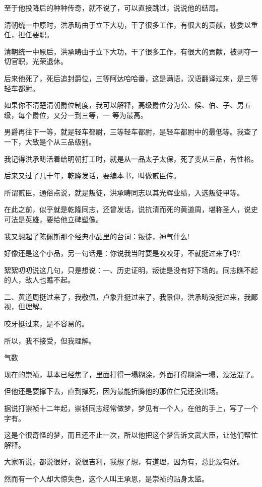 \documentclass[11pt,a4paper,onecolumn]{article}
\begin{document}
至于他投降后的种种传奇，就不说了，可以直接跳过，说说他的结局。

清朝统一中原时，洪承畴由于立下大功，干了很多工作，有很大的贡献，被委以重任，担任要职。

清朝统一中原后，洪承畴由于立下大功，干了很多工作，有很大的贡献，被剥夺一切官职，光荣退休。

后来他死了，死后追封爵位，三等阿达哈哈番，这是满语，汉语翻译过来，是三等轻车都尉。

如果你不清楚清朝爵位制度，我可以解释，高级爵位分为公、候、伯、子、男五级，每个爵位，又分一到三等，一
等为最高。

男爵再往下一等，就是轻车都尉，三等轻车都尉，是轻车都尉中的最低等。我查了一下，大致是个从三品级别。

我记得洪承畴活着给明朝打工时，就是从一品太子太保，死了变从三品，有性格。

后来又过了几十年，乾隆发话，要编本书，叫做贰臣传。

所谓贰臣，通俗点说，就是叛徒，洪承畴同志以其光辉业绩，入选叛徒甲等。

在此之前，似乎就是乾隆同志，还曾发话，说抗清而死的黄道周，堪称圣人，说史可法是英雄，要给他立碑塑像。

我又想起了陈佩斯那个经典小品里的台词：叛徒，神气什么!

好像还是这个小品，另一句话是：你说我当时要是咬咬牙，不就挺过来了吗?

絮絮叨叨说这几句，只是想说：一、历史证明，叛徒是没有好下场的。同志瞧不起的人，敌人也瞧不起。

二、黄道周挺过来了，我敬佩，卢象升挺过来了，我景仰，洪承畴没挺过来，我鄙视，但理解。

咬牙挺过来，是不容易的。

所以，我不接受，但我理解。

气数

现在的崇祯，基本已经焦了，里面打得一塌糊涂，外面打得糊涂一塌，没法混了。

但他还是要撑下去，直到撑死，因为最能折腾他的那位仁兄还没出场。

据说打崇祯十二年起，崇祯同志经常做梦，梦见有一个人，在他的手上，写了一个字\myrule 有。

这是个很奇怪的梦，而且还不止一次，所以他把这个梦告诉文武大臣，让他们帮忙解释。

大家听说，都说很好，说很吉利，我想了想，有道理，因为有，总比没有好。

然而有一个人却大惊失色，这个人叫王承恩，是崇祯的贴身太监。

\section[\thesection]{}
\end{document}
